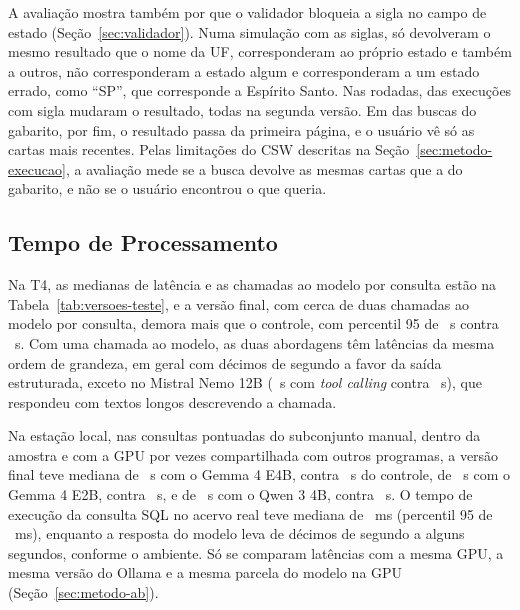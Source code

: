 A avaliação mostra também por que o validador bloqueia a sigla no campo de estado (Seção~\ref{sec:validador}). Numa simulação com as  siglas, só  devolveram o mesmo resultado que o nome da UF,  corresponderam ao próprio estado e também a outros,  não corresponderam a estado algum e  corresponderam a um estado errado, como ``SP'', que corresponde a Espírito Santo. Nas rodadas,  das  execuções com sigla mudaram o resultado, todas na segunda versão. Em  das  buscas do gabarito, por fim, o resultado passa da primeira página, e o usuário vê só as cartas mais recentes. Pelas limitações do CSW descritas na Seção~\ref{sec:metodo-execucao}, a avaliação mede se a busca devolve as mesmas cartas que a do gabarito, e não se o usuário encontrou o que queria.

\subsection{Tempo de Processamento}
\label{sec:res-tempo}

Na T4, as medianas de latência e as chamadas ao modelo por consulta estão na Tabela~\ref{tab:versoes-teste}, e a versão final, com cerca de duas chamadas ao modelo por consulta, demora mais que o controle, com percentil 95 de ~s contra ~s. Com uma chamada ao modelo, as duas abordagens têm latências da mesma ordem de grandeza, em geral com décimos de segundo a favor da saída estruturada, exceto no Mistral Nemo 12B (~s com \textit{tool calling} contra ~s), que respondeu com textos longos descrevendo a chamada.

Na estação local, nas consultas pontuadas do subconjunto manual, dentro da amostra e com a GPU por vezes compartilhada com outros programas, a versão final teve mediana de ~s com o Gemma 4 E4B, contra ~s do controle, de ~s com o Gemma 4 E2B, contra ~s, e de ~s com o Qwen 3 4B, contra ~s. O tempo de execução da consulta SQL no acervo real teve mediana de ~ms (percentil 95 de ~ms), enquanto a resposta do modelo leva de décimos de segundo a alguns segundos, conforme o ambiente. Só se comparam latências com a mesma GPU, a mesma versão do Ollama e a mesma parcela do modelo na GPU (Seção~\ref{sec:metodo-ab}).

